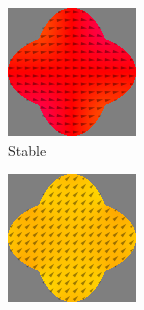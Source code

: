 \documentclass[12pt,a4paper]{article}
\begin{document}
\begin{figure}
     \centering
     \begin{subfigure}[b]{0.2\textwidth}
         \centering
         \includegraphics[width=\textwidth]{Figures/biaxial_island/BarrierMagnetization/mPlus_roundness0.60_a0.00.png}
         \caption*{Stable}
         \label{fig:barrier-magnetization-60x100_ortho}
     \end{subfigure}
     \begin{subfigure}[b]{0.2\textwidth}
         \centering
         \includegraphics[width=\textwidth]{Figures/biaxial_island/BarrierMagnetization/mPlus_roundness0.60_a0.79.png}

\end{subfigure}
\end{figure}
\end{document}

